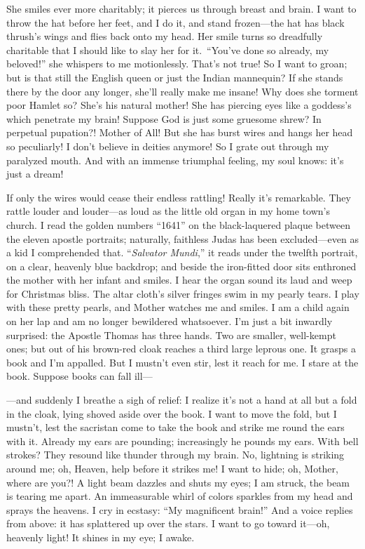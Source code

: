 \documentclass[12pt,a4paper]{article}
\begin{document}
She smiles ever more charitably; it pierces us through breast and brain. I want to throw the hat before her feet, and I do it, and stand frozen—the hat has black thrush’s wings and flies back onto my head. Her smile turns so dreadfully charitable that I should like to slay her for it. “You’ve done so already, my beloved!” she whispers to me motionlessly. That’s not true! So I want to groan; but is that still the English queen or just the Indian mannequin? If she stands there by the door any longer, she’ll really make me insane! Why does she torment poor Hamlet so? She’s his natural mother! She has piercing eyes like a goddess’s which penetrate my brain! Suppose God is just some gruesome shrew? In perpetual pupation?! Mother of All! But she has burst wires and hangs her head so peculiarly! I don’t believe in deities anymore! So I grate out through my paralyzed mouth. And with an immense triumphal feeling, my soul knows: it’s just a dream!

If only the wires would cease their endless rattling! Really it’s remarkable. They rattle louder and louder—as loud as the little old organ in my home town’s church. I read the golden numbers “1641” on the black-laquered plaque between the eleven apostle portraits; naturally, faithless Judas has been excluded—even as a kid I comprehended that. “\textit{Salvator Mundi},” it reads under the twelfth portrait, on a clear, heavenly blue backdrop; and beside the iron-fitted door sits enthroned the mother with her infant and smiles. I hear the organ sound its laud and weep for Christmas bliss. The altar cloth’s silver fringes swim in my pearly tears. I play with these pretty pearls, and Mother watches me and smiles. I am a child again on her lap and am no longer bewildered whatsoever. I’m just a bit inwardly surprised: the Apostle Thomas has three hands. Two are smaller, well-kempt ones; but out of his brown-red cloak reaches a third large leprous one. It grasps a book and I’m appalled. But I mustn’t even stir, lest it reach for me. I stare at the book. Suppose books can fall ill—

—and suddenly I breathe a sigh of relief: I realize it’s not a hand at all but a fold in the cloak, lying shoved aside over the book. I want to move the fold, but I mustn’t, lest the sacristan come to take the book and strike me round the ears with it. Already my ears are pounding; increasingly he pounds my ears. With bell strokes? They resound like thunder through my brain. No, lightning is striking around me; oh, Heaven, help before it strikes me! I want to hide; oh, Mother, where are you?! A light beam dazzles and shuts my eyes; I am struck, the beam is tearing me apart. An immeasurable whirl of colors sparkles from my head and sprays the heavens. I cry in ecstasy: “My magnificent brain!” And a voice replies from above: it has splattered up over the stars. I want to go toward it—oh, heavenly light! It shines in my eye; I awake.
\end{document}
